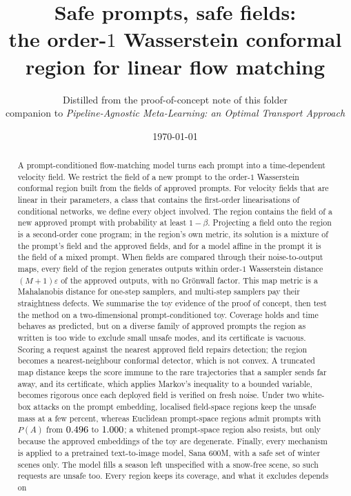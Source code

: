 \documentclass{article}
\title{Safe prompts, safe fields:\\[3pt]
\large the order-$1$ Wasserstein conformal region for linear flow matching}
\author{Distilled from the proof-of-concept note of this folder\\
companion to \emph{Pipeline-Agnostic Meta-Learning: an Optimal Transport Approach}}
\date{\today}
\theoremstyle{plain}
\theoremstyle{remark}
\begin{document}
\maketitle

\begin{abstract}
A prompt-conditioned flow-matching model turns each prompt into a time-dependent velocity
field. We restrict the field of a new prompt to the order-$1$ Wasserstein conformal region
built from the fields of approved prompts. For velocity fields that are linear in their
parameters, a class that contains the first-order linearisations of conditional networks, we
define every object involved. The region contains the field of a new
approved prompt with probability at least $1-\beta$. Projecting a field onto the region is a
second-order cone program; in the region's own metric, its solution is a mixture of the
prompt's field and the approved fields, and for a model affine in the prompt it is the field of
a mixed prompt. When fields are
compared through their noise-to-output maps, every field of the region generates outputs within
order-$1$ Wasserstein distance $(M+1)\varepsilon$ of the approved outputs, with no Gr\"onwall
factor. This map metric is a Mahalanobis distance for one-step samplers, and multi-step
samplers pay their straightness defects. We summarise the toy evidence of the proof of concept, then test the method on a two-dimensional
prompt-conditioned toy. Coverage holds and time behaves as predicted, but on a diverse family of approved
prompts the region as written is too wide to exclude small unsafe modes, and its certificate is vacuous.
Scoring a request against the nearest approved field repairs detection; the region becomes a nearest-neighbour conformal
detector, which is not convex. A truncated map distance keeps the score immune to the rare trajectories that a sampler sends far
away, and its certificate, which applies Markov's inequality to a bounded variable, becomes rigorous once each deployed field is
verified on fresh noise. Under two white-box attacks on the prompt embedding, localised field-space regions keep the unsafe mass
at a few percent, whereas Euclidean prompt-space regions admit prompts with $P(A)$ from $0.496$ to $1.000$; a whitened
prompt-space region also resists, but only because the approved embeddings of the toy are degenerate. Finally, every mechanism is
applied to a pretrained text-to-image model, Sana 600M, with a safe set of winter scenes only. The model fills a season left
unspecified with a snow-free scene, so such requests are unsafe too. Every region keeps its coverage, and what it excludes depends on

\end{abstract}
\end{document}
